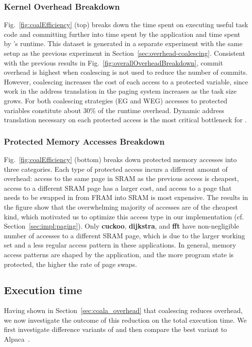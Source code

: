 \subsubsection{\sys Kernel Overhead Breakdown}
%
Fig.~\ref{fig:coalEfficiency} (top) breaks down the time spent on executing
useful task code and committing further into time spent by the application and
time spent by \sys's runtime.
%
This dataset is generated in a separate experiment with the same setup as the
previous experiment in Section~\ref{sec:overhead-coalescing}.
%
Consistent with the previous results in
Fig.~\ref{fig:overallOverheadBreakdown}, commit overhead is highest when
coalescing is not used to reduce the number of commits.
%
However, coalescing increases the cost of each access to a protected variable,
since work in the address translation in the paging system increases as the
task size grows.
%
For both coalescing strategies (EG and WEG) accesses to protected variables
constitute about 30\% of the runtime overhead. Dynamic address translation
necessary on each protected access is the most critical bottleneck for \sys.
%
\subsubsection{Protected Memory Accesses Breakdown}
%
Fig.~\ref{fig:coalEfficiency} (bottom) breaks down protected memory accesses
into three categories.
%
Each type of protected access incurs a different amount of overhead: access to
the same page in SRAM as the previous access is cheapest, access to a different
SRAM page has a larger cost, and access to a page that needs to be swapped in
from FRAM into SRAM is most expensive.
%
The results in the figure show that the overwhelming majority of accesses are
of the cheapest kind, which motivated us to optimize this access type in our
implementation (cf. Section~\ref{sec:impl:paging}).
%
Only \textbf{cuckoo}, \textbf{dijkstra}, and \textbf{fft} have non-negligible
number of accesses to a different SRAM page, which is due to the larger working
set and a less regular access pattern in these applications.
%
In general, memory access patterns are shaped by the application, and the more
program state is protected, the higher the rate of page swaps.
%
\subsection{Execution time}
\label{sec:result_coalescing}
%
Having shown in Section~\ref{sec:coala_overhead} that coalescing reduces
overhead, we now investigate the outcome of this reduction on the total
execution time. We first investigate difference variants of \sys and
then compare the best variant to Alpaca~\cite{alpaca}.
%
